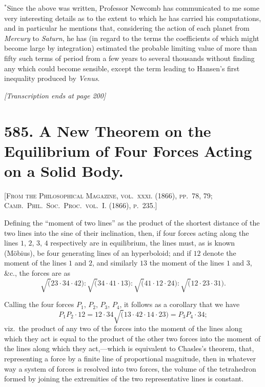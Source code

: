 \documentclass[11pt,a4paper]{book}
\begin{document}
\bigskip
\noindent$^*$Since the above was written, Professor Newcomb has communicated to me some very interesting details as to the extent to which he has carried his computations, and in particular he mentions that, considering the action of each planet from \textit{Mercury} to \textit{Saturn}, he has (in regard to the terms the coefficients of which might become large by integration) estimated the probable limiting value of more than fifty such terms of period from a few years to several thousands without finding any which could become sensible, except the term leading to Hansen's first inequality produced by \textit{Venus}.

\vfill
\begin{center}
\textit{[Transcription ends at page 200]}
\end{center}
\clearpage


\newpage

\section*{585. A New Theorem on the Equilibrium of Four Forces Acting on a Solid Body.}

\noindent\textsc{[From the Philosophical Magazine, vol.~\textsc{xxxi}. (1866), pp.~78, 79;\\Camb.\ Phil.\ Soc.\ Proc.\ vol.~\textsc{I}. (1866), p.~235.]}

\medskip

Defining the ``moment of two lines'' as the product of the shortest distance of the two lines into the sine of their inclination, then, if four forces acting along the lines $1$, $2$, $3$, $4$ respectively are in equilibrium, the lines must, as is known (M\"obius), be four generating lines of an hyperboloid; and if $12$ denote the moment of the lines $1$ and $2$, and similarly $13$ the moment of the lines $1$ and $3$, \&c., the forces are as
\[
\surd(23 \cdot 34 \cdot 42) : \surd(34 \cdot 41 \cdot 13) : \surd(41 \cdot 12 \cdot 24) : \surd(12 \cdot 23 \cdot 31).
\]

Calling the four forces $P_1$, $P_2$, $P_3$, $P_4$, it follows as a corollary that we have
\[
P_1 P_2 \cdot 12 = 12 \cdot 34 \surd(13 \cdot 42 \cdot 14 \cdot 23) = P_3 P_4 \cdot 34;
\]
viz.\ the product of any two of the forces into the moment of the lines along which they act is equal to the product of the other two forces into the moment of the lines along which they act,---which is equivalent to Chasles's theorem, that, representing a force by a finite line of proportional magnitude, then in whatever way a system of forces is resolved into two forces, the volume of the tetrahedron formed by joining the extremities of the two representative lines is constant.
\end{document}
